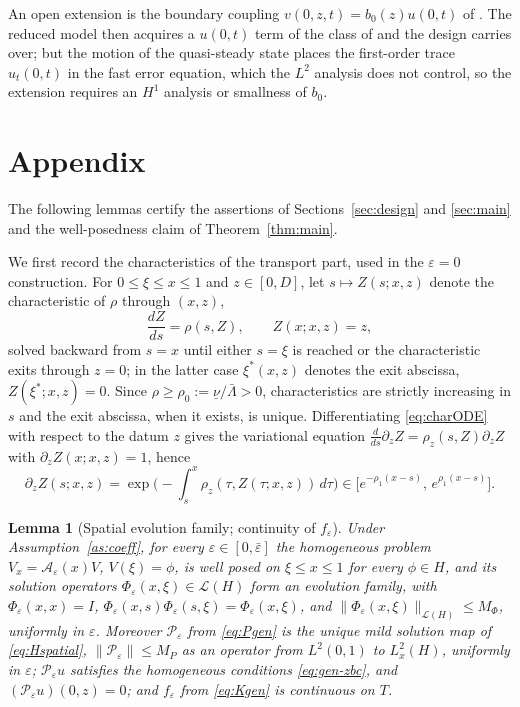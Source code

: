 \documentclass[12pt]{article}
\theoremstyle{plain}
\newtheorem{lemma}{Lemma}
\theoremstyle{remark}
\newcommand{\un}{\underline\nu}
\newcommand{\PP}{\mathcal P}
\newcommand{\Hs}{H}
\begin{document}
An open extension is the boundary coupling $v(0,z,t)=b_0(z)u(0,t)$ of \cite[eq.~(4)]{AlleaumeKrstic2025}. The reduced model then acquires a $u(0,t)$ term of the class of \cite{KrsticSmyshlyaev2008} and the design carries over; but the motion of the quasi-steady state places the first-order trace $u_t(0,t)$ in the fast error equation, which the $L^2$ analysis does not control, so the extension requires an $H^1$ analysis or smallness of $b_0$.


\appendix
\section*{Appendix}
The following lemmas certify the assertions of Sections~\ref{sec:design} and \ref{sec:main} and the well-posedness claim of Theorem~\ref{thm:main}.

We first record the characteristics of the transport part, used in the $\varepsilon=0$ construction. For $0\le\xi\le x\le1$ and $z\in[0,D]$, let $s\mapsto Z(s;x,z)$ denote the characteristic of $\rho$ through $(x,z)$,
\begin{equation}
 \frac{dZ}{ds}=\rho(s,Z),\qquad Z(x;x,z)=z,
 \label{eq:charODE}
\end{equation}
solved backward from $s=x$ until either $s=\xi$ is reached or the characteristic exits through $z=0$; in the latter case $\xi^*(x,z)$ denotes the exit abscissa, $Z(\xi^*;x,z)=0$. Since $\rho\ge\rho_0:=\un/\bar\Lambda>0$, characteristics are strictly increasing in $s$ and the exit abscissa, when it exists, is unique. Differentiating \eqref{eq:charODE} with respect to the datum $z$ gives the variational equation $\tfrac{d}{ds}\partial_zZ=\rho_z(s,Z)\partial_zZ$ with $\partial_zZ(x;x,z)=1$, hence
\begin{equation}
 \partial_z Z(s;x,z)
 =\exp\!\Big(-\!\int_s^x\rho_z(\tau,Z(\tau;x,z))\,d\tau\Big)
 \in\big[e^{-\rho_1(x-s)},\,e^{\rho_1(x-s)}\big].
 \label{eq:charJac}
\end{equation}

\begin{lemma}[Spatial evolution family; continuity of $f_\varepsilon$]\label{lem:evolution}
Under Assumption~\ref{as:coeff}, for every $\varepsilon\in[0,\bar\varepsilon]$ the homogeneous problem $V_x=\mathcal A_\varepsilon(x)V$, $V(\xi)=\phi$, is well posed on $\xi\le x\le1$ for every $\phi\in\Hs$, and its solution operators $\Phi_\varepsilon(x,\xi)\in\mathcal L(\Hs)$ form an evolution family, with $\Phi_\varepsilon(x,x)=I$, $\Phi_\varepsilon(x,s)\Phi_\varepsilon(s,\xi)=\Phi_\varepsilon(x,\xi)$, and $\|\Phi_\varepsilon(x,\xi)\|_{\mathcal L(\Hs)}\le M_\Phi$, uniformly in $\varepsilon$. Moreover $\PP_\varepsilon$ from \eqref{eq:Pgen} is the unique mild solution map of \eqref{eq:Hspatial}, $\|\PP_\varepsilon\|\le M_P$ as an operator from $L^2(0,1)$ to $L^2_x(\Hs)$, uniformly in $\varepsilon$; $\PP_\varepsilon u$ satisfies the homogeneous conditions \eqref{eq:gen-zbc}, and $(\PP_\varepsilon u)(0,z)=0$; and $f_\varepsilon$ from \eqref{eq:Kgen} is continuous on $T$.
\end{lemma}
\end{document}
